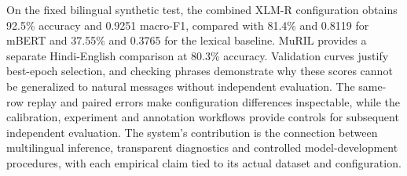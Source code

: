 \documentclass[journal]{IEEEtran}
\begin{document}
On the fixed bilingual synthetic test, the combined XLM-R configuration obtains 92.5\% accuracy and 0.9251 macro-F1, compared with 81.4\% and 0.8119 for mBERT and 37.55\% and 0.3765 for the lexical baseline. MuRIL provides a separate Hindi-English comparison at 80.3\% accuracy. Validation curves justify best-epoch selection, and checking phrases demonstrate why these scores cannot be generalized to natural messages without independent evaluation. The same-row replay and paired errors make configuration differences inspectable, while the calibration, experiment and annotation workflows provide controls for subsequent independent evaluation. The system's contribution is the connection between multilingual inference, transparent diagnostics and controlled model-development procedures, with each empirical claim tied to its actual dataset and configuration.

\begingroup
{}


\endgroup
\end{document}
